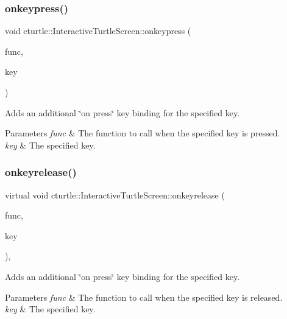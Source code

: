 \subsubsection{\texorpdfstring{onkeypress()}{onkeypress()}}
{\footnotesize\ttfamily void cturtle\+::\+Interactive\+Turtle\+Screen\+::onkeypress (\begin{DoxyParamCaption}\item[{Key\+Func}]{func,  }\item[{Keyboard\+Key}]{key }\end{DoxyParamCaption})\hspace{0.3cm}{\ttfamily [inline]}}



Adds an additional \char`\"{}on press\char`\"{} key binding for the specified key. 


\begin{DoxyParams}{Parameters}
{\em func} & The function to call when the specified key is pressed. \\
\hline
{\em key} & The specified key. \\
\hline
\end{DoxyParams}
\mbox{\label{classcturtle_1_1InteractiveTurtleScreen_a313943b2ae07b9a67ae0681fbadc2085}} 
\subsubsection{\texorpdfstring{onkeyrelease()}{onkeyrelease()}}
{\footnotesize\ttfamily virtual void cturtle\+::\+Interactive\+Turtle\+Screen\+::onkeyrelease (\begin{DoxyParamCaption}\item[{Key\+Func}]{func,  }\item[{Keyboard\+Key}]{key }\end{DoxyParamCaption})\hspace{0.3cm}{\ttfamily [inline]}, {\ttfamily [virtual]}}



Adds an additional \char`\"{}on press\char`\"{} key binding for the specified key. 


\begin{DoxyParams}{Parameters}
{\em func} & The function to call when the specified key is released. \\
\hline
{\em key} & The specified key. \\
\hline
\end{DoxyParams}
\mbox{\label{classcturtle_1_1InteractiveTurtleScreen_ab60ddd682f7fa7df3635f936bcfd2f70}} 
